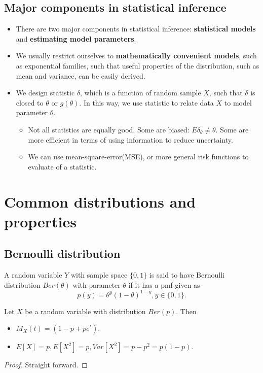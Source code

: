 \begin{refsection}
\subsection{Major components in statistical inference}
\begin{itemize}
	\item There are two major components in statistical inference: \textbf{statistical models} and \textbf{estimating model parameters}.
	\item We usually restrict ourselves to \textbf{ mathematically convenient models}, such as exponential families, such that useful properties of the distribution, such as mean and variance, can be easily derived.  
	\item We design statistic $\delta$, which is a function of random sample $X$, such that $\delta$ is closed to $\theta$ or $g(\theta)$. In this way, we use statistic to relate data $X$ to model parameter $\theta$.
	\begin{itemize}
		\item Not all statistics are equally good. Some are biased: $E\delta_\theta \neq \theta$. Some are more efficient in terms of using information to reduce uncertainty.
		\item We can use mean-square-error(MSE), or more general risk functions to evaluate of a statistic. 
	\end{itemize}
	
\end{itemize}

\section{Common distributions and properties}




\subsection{Bernoulli distribution}
\begin{definition}
	A random variable $Y$ with sample space $\{0,1\}$ is said to have Bernoulli distribution $Ber(\theta)$ with parameter $\theta$ if it has a pmf given as
	$$p(y) = \theta^y(1-\theta)^{1-y}, y\in \{0,1\}.$$
\end{definition}

\begin{lemma}\label{ch:theory-of-statistics:th:Bernoullidistributionproperty}
Let $X$ be a random variable with distribution $Ber(p)$. Then
\begin{itemize}
	\item $M_X(t) = (1 - p + pe^t)$.
	\item $E[X] = p, E[X^2] = p, Var[X^2] = p - p^2 = p(1-p).$
\end{itemize}
\end{lemma}
\begin{proof}
Straight forward.
\end{proof}




\end{refsection}
